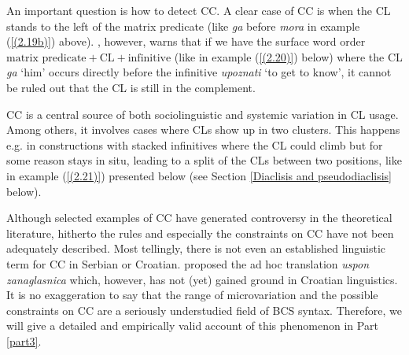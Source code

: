 \noindent An important question is how to detect CC. A clear case of CC is when the CL stands to the left of the matrix predicate (like \textit{ga} before \textit{mora} in example (\ref{(2.19b)}) above). \citet[67]{Junghanns02}, however, warns that if we have the surface word order $\text{matrix predicate} + \text{CL} + \text{infinitive}$ (like in example (\ref{(2.20)}) below) where the CL \textit{ga} `him' occurs directly before the infinitive \textit{upoznati} `to get to know', it cannot be ruled out that the CL is still in the complement. 


\noindent CC is a central source of both sociolinguistic and systemic variation in CL usage. Among others, it involves cases where CLs show up in two clusters. This happens e.g. in constructions with stacked infinitives where the CL could climb but for some reason stays in situ, leading to a split of the CLs between two positions, like in example (\ref{(2.21)}) presented below (see Section \ref{Diaclisis and pseudodiaclisis} below). 


\noindent Although selected examples of CC have generated controversy in the theoretical literature, hitherto the rules and especially the constraints on CC have not been adequately described. Most tellingly, there is not even an established linguistic term for CC in Serbian or Croatian. \citet{HRK13} proposed the ad hoc translation \textit{uspon zanaglasnica} which, however, has not (yet) gained ground in Croatian linguistics. It is no exaggeration to say that the range of microvariation and the possible constraints on CC are a seriously understudied field of BCS syntax. Therefore, we will give a detailed and empirically valid account of this phenomenon in Part \ref{part3}.

